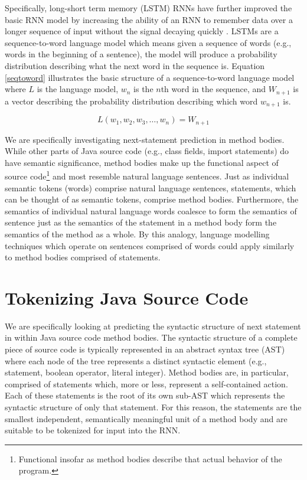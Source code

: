 \documentclass{article}
\begin{document}
Specifically, long-short term memory (LSTM) RNNs have further improved
the basic RNN model by increasing the ability of an RNN to remember
data over a longer sequence of input without the signal decaying
quickly \cite{LSTMArticle}. LSTMs are a sequence-to-word language
model which means given a sequence of words (e.g., words in the
beginning of a sentence), the model will produce a probability
distribution describing what the next word in the sequence is.
Equation \ref{seqtoword} illustrates the basic structure of a
sequence-to-word language model where $L$ is the language model,
$w_n$ is the $n$th word in the sequence, and $W_{n+1}$ is a vector
describing the probability distribution describing which word $w_{n+1}$
is.

\begin{equation}
\label{seqtoword}
    L(w_1, w_2, w_3, \dots, w_n) = W_{n+1}
\end{equation}

We are specifically investigating next-statement prediction in method
bodies. While other parts of Java source code (e.g., class fields,
import statements) do have semantic significance, method bodies make up
the functional aspect of source code\footnote{
Functional insofar as method bodies describe that actual
behavior of the program.} and most resemble natural language sentences.
Just as individual semantic tokens (words) comprise natural language
sentences, statements, which can be thought of as semantic tokens,
comprise method bodies. Furthermore, the semantics of individual natural
language words coalesce to form the semantics of sentence just as the
semantics of the statement in a method body form the semantics of the
method as a whole. By this analogy, language modelling techniques which
operate on sentences comprised of words could apply similarly to method
bodies comprised of statements.



\section{Tokenizing Java Source Code}

We are specifically looking at predicting the syntactic structure  of next 
statement in within Java source code method bodies. The syntactic structure 
of a complete piece of source code is typically represented in an abstract 
syntax tree (AST) where each node of the tree represents a distinct 
syntactic element (e.g., statement, boolean operator, literal integer). 
Method bodies are, in particular, comprised of statements which, more or 
less, represent a self-contained action. Each of these statements is the 
root of its own sub-AST which represents the syntactic structure of only 
that statement. For this reason, the statements are the smallest 
independent, semantically meaningful unit of a method body and are suitable 
to be tokenized for input into the RNN.
\end{document}
